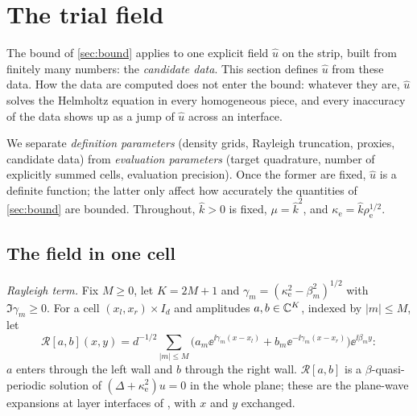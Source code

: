 \section{The trial field}\label{sec:field}

The bound of \cref{sec:bound} applies to one explicit field $\widehat u$ on the
strip, built from finitely many numbers: the \emph{candidate data}. This section
defines $\widehat u$ from these data. How the data are computed does not enter
the bound: whatever they are, $\widehat u$ solves the Helmholtz equation in
every homogeneous piece, and every inaccuracy of the data shows up as a jump of
$\widehat u$ across an interface.

We separate \emph{definition parameters} (density grids, Rayleigh truncation,
proxies, candidate data) from \emph{evaluation parameters} (target quadrature,
number of explicitly summed cells, evaluation precision). Once the former are
fixed, $\widehat u$ is a definite function; the latter only affect how
accurately the quantities of \cref{sec:bound} are bounded. Throughout,
$\widehat k>0$ is fixed, $\mu=\widehat k^2$, and $\kappa_{\mathrm e}=\widehat
k\rho_{\mathrm e}^{1/2}$.

\subsection{The field in one cell}\label{sec:layer}
\emph{Rayleigh term.} Fix $M\ge0$, let $K=2M+1$ and
$\gamma_m=(\kappa_{\mathrm e}^2-\beta_m^2)^{1/2}$ with $\Im\gamma_m\ge0$. For a cell
$(x_l,x_r)\times I_d$ and amplitudes $a,b\in\mathbb{C}^K$, indexed by $|m|\le M$, let
\begin{equation}\label{eq:rayleigh}
  \mathcal R[a,b](x,y)=d^{-1/2}\sum_{|m|\le M}
  \bigl(a_m\ee^{\ii\gamma_m(x-x_l)}+b_m\ee^{-\ii\gamma_m(x-x_r)}\bigr)\ee^{\ii\beta_my}:
\end{equation}
$a$ enters through the left wall and $b$ through the right wall. $\mathcal
R[a,b]$ is a $\beta$-quasi-periodic solution of $(\Delta+\kappa_{\mathrm
e}^2)u=0$ in the whole plane; these are the plane-wave expansions at layer
interfaces of \cite[eq.~(3)]{BottenEtAl2004}, with $x$ and $y$ exchanged.

